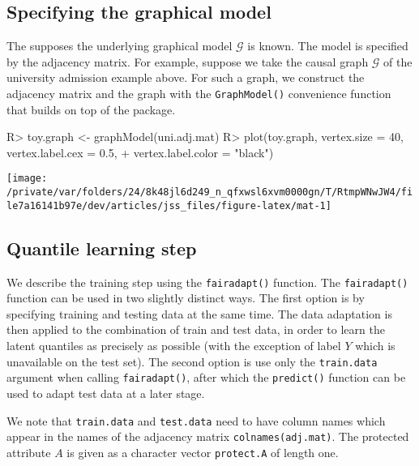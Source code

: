 \documentclass[
  notitle]{jss}
\begin{document}
\hypertarget{specifying-the-graphical-model}{%
\subsection{Specifying the graphical
model}\label{specifying-the-graphical-model}}

The  supposes the underlying graphical model
\(\mathcal{G}\) is known. The model is specified by the adjacency
matrix. For example, suppose we take the causal graph \(\mathcal{G}\) of
the university admission example above. For such a graph, we construct
the adjacency matrix and the graph with the \texttt{GraphModel()}
convenience function that builds on top of the  package.

\begin{CodeChunk}
\begin{CodeInput}
R> toy.graph <- graphModel(uni.adj.mat)
R> plot(toy.graph, vertex.size = 40, vertex.label.cex = 0.5,
+   vertex.label.color = "black")
\end{CodeInput}


\begin{center}\texttt{[image: /private/var/folders/24/8k48jl6d249\_n\_qfxwsl6xvm0000gn/T/RtmpWNwJW4/file7a16141b97e/dev/articles/jss\_files/figure-latex/mat-1]} \end{center}

\end{CodeChunk}

\hypertarget{quantile-learning-step}{%
\subsection{Quantile learning step}\label{quantile-learning-step}}

We describe the training step using the \texttt{fairadapt()} function.
The \texttt{fairadapt()} function can be used in two slightly distinct
ways. The first option is by specifying training and testing data at the
same time. The data adaptation is then applied to the combination of
train and test data, in order to learn the latent quantiles as precisely
as possible (with the exception of label \(Y\) which is unavailable on
the test set). The second option is use only the \texttt{train.data}
argument when calling \texttt{fairadapt()}, after which the
\texttt{predict()} function can be used to adapt test data at a later
stage.

We note that \texttt{train.data} and \texttt{test.data} need to have
column names which appear in the names of the adjacency matrix
\texttt{colnames(adj.mat)}. The protected attribute \(A\) is given as a
character vector \texttt{protect.A} of length one.
\end{document}
